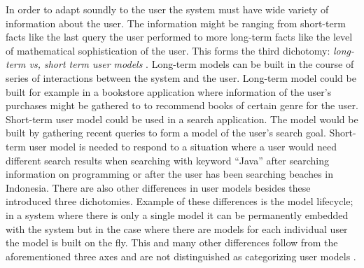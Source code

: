 \documentclass{sigchi}
\begin{document}
In order to adapt soundly to the user the system must have wide variety of information about the user. The information might be ranging from short-term facts like the last query the user performed to more long-term facts like the level of mathematical sophistication of the user. This forms the third dichotomy: \textit{long-term vs, short term user models} \cite{rich99}. Long-term models can be built in the course of series of interactions between the system and the user. Long-term model could be built for example in a bookstore application where information of the user's purchases might be gathered to to recommend books of certain genre for the user. Short-term user model could be used in a search application. The model would be built by gathering recent queries to form a model of the user's search goal. Short-term user model is needed to respond to a situation where a user would need different search results when searching with keyword “Java” after searching information on programming or after the user has been searching beaches in Indonesia. There are also other differences in user models besides these introduced three dichotomies. Example of these differences is the model lifecycle; in a system where there is only a single model it can be permanently embedded with the system but in the case where there are models for each individual user the model is built on the fly. This and many other differences follow from the aforementioned three axes and are not distinguished as categorizing user models \cite{rich99}. 
\end{document}
